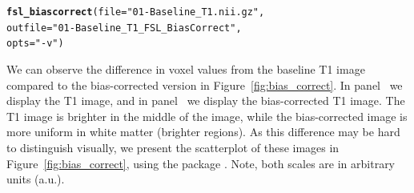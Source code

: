 \documentclass[a4paper]{report}\usepackage[]{graphicx}\usepackage[]{color}
\makeatletter
\newcommand{\hlstr}[1]{\textcolor[rgb]{0.192,0.494,0.8}{#1}}%
\newcommand{\hlstd}[1]{\textcolor[rgb]{0.345,0.345,0.345}{#1}}%
\newcommand{\hlkwc}[1]{\textcolor[rgb]{0.333,0.667,0.333}{#1}}%
\newcommand{\hlkwd}[1]{\textcolor[rgb]{0.737,0.353,0.396}{\textbf{#1}}}%
\newenvironment{kframe}{%
 \def\at@end@of@kframe{}%
 \ifinner\ifhmode%
  \def\at@end@of@kframe{\end{minipage}}%
  \begin{minipage}{\columnwidth}%
 \fi\fi%
 \def\FrameCommand##1{\hskip\@totalleftmargin \hskip-\fboxsep
 \colorbox{shadecolor}{##1}\hskip-\fboxsep
     \hskip-\linewidth \hskip-\@totalleftmargin \hskip\columnwidth}%
 \MakeFramed {\advance\hsize-\width
   \@totalleftmargin\z@ \linewidth\hsize
   \@setminipage}}%
 {\par\unskip\endMakeFramed%
 \at@end@of@kframe}
\newenvironment{knitrout}{}{} %
\newcommand{\CRANpkg}[1]{\href{http://CRAN.R-project.org/package=#1}{\pkg{#1}}}%
\let\pkg=\strong
\makeatother
\begin{document}
\begin{article}
\begin{knitrout}
\color{fgcolor}\begin{kframe}
\begin{alltt}
\hlkwd{fsl_biascorrect}\hlstd{(}\hlkwc{file} \hlstd{=} \hlstr{"01-Baseline_T1.nii.gz"}\hlstd{,}
                \hlkwc{outfile}\hlstd{=} \hlstr{"01-Baseline_T1_FSL_BiasCorrect"}\hlstd{,}
                \hlkwc{opts}\hlstd{=} \hlstr{"-v"}\hlstd{)}
\end{alltt}
\end{kframe}
\end{knitrout}




We can observe the difference in voxel values from the baseline T1 image compared to the bias-corrected version in Figure~\ref{fig:bias_correct}.  In panel~\protect{} we display the T1 image, and in panel~\protect{} we display the bias-corrected T1 image.  The T1 image is brighter in the middle of the image, while the bias-corrected image is more uniform in white matter (brighter regions).  As this difference may be hard to distinguish visually, we present the scatterplot of these images in Figure~\ref{fig:bias_correct}\protect{}, using the \CRANpkg{ggplot2} package \citep{wickham_ggplot2:_2009}.  Note, both scales are in arbitrary units (a.u.).



\end{article}
\end{document}
